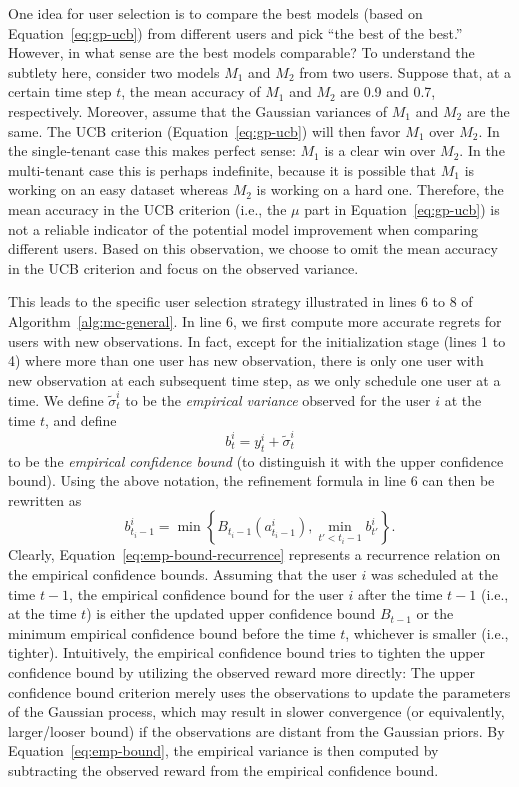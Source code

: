\documentclass[letterpaper]{vldb}
\begin{document}
One idea for user selection is to compare the best models (based on Equation~\ref{eq:gp-ucb}) from different users and pick ``the best of the best.''
However, in what sense are the best models comparable?
To understand the subtlety here, consider two models $M_1$ and $M_2$ from two users.
Suppose that, at a certain time step $t$, the mean accuracy of $M_1$ and $M_2$ are 0.9 and 0.7, respectively.
Moreover, assume that the Gaussian variances of $M_1$ and $M_2$ are the same.
The UCB criterion (Equation~\ref{eq:gp-ucb}) will then favor $M_1$ over $M_2$.
In the single-tenant case this makes perfect sense: $M_1$ is a clear win over $M_2$.
In the multi-tenant case this is perhaps indefinite, because it is possible that $M_1$ is working on an easy dataset whereas $M_2$ is working on a hard one.
Therefore, the mean accuracy in the UCB criterion (i.e., the $\mu$ part in Equation~\ref{eq:gp-ucb}) is not a reliable indicator of the potential model improvement when comparing different users.
Based on this observation, we choose to omit the mean accuracy in the UCB criterion and focus on the observed variance.

This leads to the specific user selection strategy illustrated in lines 6 to 8 of Algorithm~\ref{alg:mc-general}.
In line 6, we first compute more accurate regrets for users with new observations.
In fact, except for the initialization stage (lines 1 to 4) where more than one user has new observation, there is only one user with new observation at each subsequent time step, as we only schedule one user at a time.
We define $\tilde{\sigma}_t^i$ to be the \emph{empirical variance} observed for the user $i$ at the time $t$, and define 
\begin{equation}\label{eq:emp-bound}
b_t^i=y_t^i + \tilde{\sigma}_t^i
\end{equation}
to be the \emph{empirical confidence bound} (to distinguish it with the upper confidence bound).
Using the above notation, the refinement formula in line 6 can then be rewritten as
\begin{equation}\label{eq:emp-bound-recurrence}
b_{t_i-1}^i=\min\left\{B_{t_i-1}(a^i_{t_i-1}), \min_{t'<t_i-1} b^i_{t'}\right\}.
\end{equation}
Clearly, Equation~\ref{eq:emp-bound-recurrence} represents a recurrence relation on the empirical confidence bounds.
Assuming that the user $i$ was scheduled at the time $t-1$, the empirical confidence bound for the user $i$ after the time $t-1$ (i.e., at the time $t$) is either the updated upper confidence bound $B_{t-1}$
or the minimum empirical confidence bound before the time $t$, whichever is smaller (i.e., tighter).
Intuitively, the empirical confidence bound tries to tighten the upper confidence bound by utilizing the observed reward more directly: The upper confidence bound criterion merely uses the observations to update the parameters of the Gaussian process, which may result in slower convergence (or equivalently, larger/looser bound) if the observations are distant from the Gaussian priors.
By Equation~\ref{eq:emp-bound}, the empirical variance is then computed by subtracting the observed reward from the empirical confidence bound.
\end{document}

